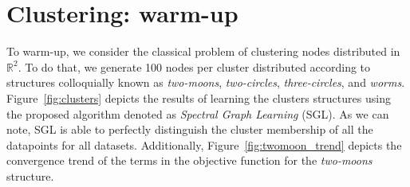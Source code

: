 \section{Clustering: warm-up}
To warm-up, we consider the classical problem of clustering nodes distributed
in $\mathbb{R}^{2}$. To do that, we generate 100 nodes per cluster distributed according to
structures colloquially known as \textit{two-moons}, \textit{two-circles}, \textit{three-circles},
and \textit{worms}.
Figure~\ref{fig:clusters} depicts the results of learning the
clusters structures using the proposed algorithm denoted as \textit{Spectral Graph Learning} (\textsf{SGL}).
As we can note, \textsf{SGL} is able to perfectly distinguish the cluster membership
of all the datapoints for all datasets. Additionally, Figure~\ref{fig:twomoon_trend}
depicts the convergence trend of the terms in the objective function for the
\textit{two-moons} structure.

